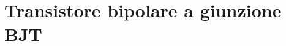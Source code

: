 \documentclass[../elettronica]{subfiles}
\begin{document}
\section{Transistore bipolare a giunzione BJT}
\end{document}
